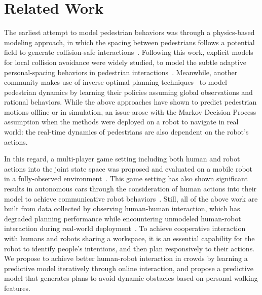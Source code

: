 \documentclass[conference]{IEEEtran}
\begin{document}


\vspace{-0.2em}
\section{Related Work}
\label{sec:related}
\vspace{-0.4em}
The earliest attempt to model pedestrian behaviors was through a physics-based 
modeling approach, in which the spacing between pedestrians follows a 
potential field to generate collision-safe 
interactions~\cite{helbing1995social}. Following this work, explicit models 
for local collision avoidance were widely studied, to model the subtle 
adaptive personal-spacing behaviors in pedestrian 
interactions~\cite{papadakis2014adaptive}. Meanwhile, another community 
makes use of inverse optimal planning 
techniques~\cite{ziebart2009planning,henry2010learning,vasquez2014inverse} to 
model pedestrian dynamics by learning their policies assuming global observations and 
rational behaviors.
While the above approaches have shown to predict pedestrian motions 
offline or in simulation, an issue arose with the Markov Decision 
Process assumption when the methods were deployed on a robot to navigate in real world:
the real-time dynamics of pedestrians are also dependent on the robot's 
actions. 

In this regard, a multi-player game setting including both human and robot actions into the joint state space was proposed and evaluated on a mobile robot in a fully-observed environment~\cite{trautman2010unfreezing}. This game setting has also shown significant results in autonomous cars through the consideration of human actions into their model to achieve communicative robot behaviors~\cite{sadigh2016planning}.
Still, all of the above work are built from data collected by observing human-human 
interaction, which has degraded planning performance while encountering unmodeled 
human-robot interaction during real-world 
deployment~\cite{trautman2015robot, pfeiffer2016predicting}. To achieve 
cooperative interaction with humans and robots sharing a workspace, it is 
an essential capability for the robot to identify people's 
intentions, and then plan responsively to their actions. We propose to achieve 
better human-robot interaction in crowds by learning a predictive model 
iteratively through online interaction, and propose a predictive model 
that generates plans to avoid dynamic obstacles based on personal walking features. 
\vspace{-0.2em}
\end{document}

